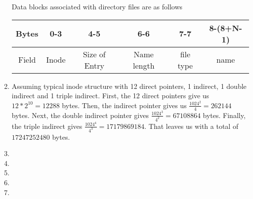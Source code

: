 \documentclass[12pt,letterpaper]{report}
\begin{document}
\begin{enumerate}
Data blocks associated with directory files are as follows\\
\begin{tabular}{|c|c|c|c|c|c|}
\hline
Bytes & 0-3 & 4-5 & 6-6 & 7-7 & 8-(8+N-1) \\
\hline
Field & Inode & Size of Entry & Name length & file type & name\\
\hline
\end{tabular}
\item Assuming typical inode structure with 12 direct pointers, 1 indirect, 1 double indirect and 1 triple indirect. First, the 12 direct pointers give us $12 * 2^{10} = 12288$ bytes. Then, the indirect pointer gives us $\frac{1024^2}{4} = 262144$ bytes. Next, the double indirect pointer gives $\frac{1024^3}{4^2} = 67108864$ bytes. Finally, the triple indirect gives $\frac{1024^4}{4^3} = 17179869184$. That leaves us with a total of $17247252480$ bytes.

\item

\item

\item

\item

\item



\end{enumerate}
\end{document}
